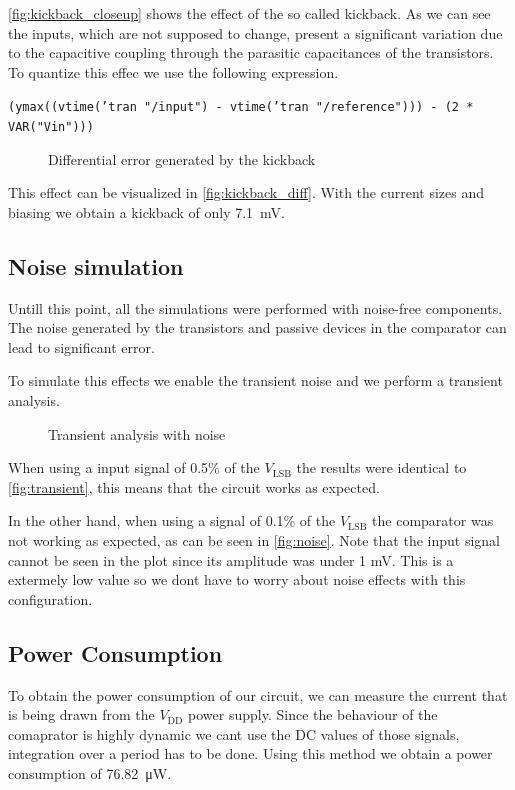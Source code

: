 \documentclass{article}
\newcommand*{\subb}[1]{\ensuremath{_{\mathrm{#1}}}}
\begin{document}
 \autoref{fig:kickback_closeup} shows the effect of the so called kickback. As we can see the inputs, which are not supposed to change, present a significant variation due to the capacitive coupling through the parasitic capacitances of the transistors.
 To quantize this effec we use the following expression.

 \texttt{(ymax((vtime('tran "/input") - vtime('tran "/reference"))) - (2 * VAR("Vin")))}\bigskip

 \begin{figure}[!h]
  \centering
  \caption{Differential error generated by the kickback}
  \label{fig:kickback_diff}
  
 \end{figure}

 This effect can be visualized in \autoref{fig:kickback_diff}.
 With the current sizes and biasing we obtain a kickback of only \SI{7.1}{\mV}.
 \subsection{Noise simulation}
 Untill this point, all the simulations were performed with noise-free components. The noise generated by the transistors and passive devices in the comparator can lead to significant error.

 To simulate this effects we enable the transient noise and we perform a transient analysis.

 \begin{figure}[!h]
  \centering
  \caption{Transient analysis with noise}
  \label{fig:noise}
  
 \end{figure}
  
 When using a input signal of 0.5\% of the $V\subb{LSB}$ the results were identical to \autoref{fig:transient}, this means that the circuit works as expected. 
 
 In the other hand, when using a signal of 0.1\% of the $V\subb{LSB}$ the comparator was not working as expected, as can be seen in \autoref{fig:noise}. Note that the input signal cannot be seen in the plot since its amplitude was under 1 mV. This is a extermely low value so we dont have to worry about noise effects with this configuration.
 \subsection{Power Consumption}
 To obtain the power consumption of our circuit, we can measure the current that is being drawn from the $V\subb{DD}$ power supply. Since the behaviour of the comaprator is highly dynamic we cant use the DC values of those signals, integration over a period has to be done. Using this method we obtain a power consumption of \SI{76.82}{\uW}.
\end{document}
